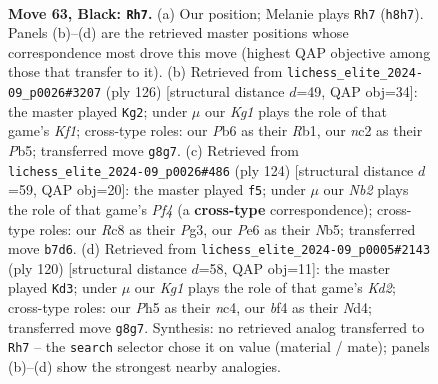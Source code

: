 \documentclass[11pt]{article}
\begin{document}
\clearpage

\begin{figure}[p]\centering
\begin{subfigure}{0.46\textwidth}\centering
\resizebox{\linewidth}{!}{%
\newchessgame
\chessboard[
  setfen={2r3kr/pn6/1p2p3/7p/2P1PB2/3K2PR/P1N2R2/8 b - - 9 63},
  showmover=false,
  pgfstyle=straightmove, color=movearrow, markmove={h8-h7}
]}
\caption{}
\end{subfigure}\hfill
\begin{subfigure}{0.46\textwidth}\centering
\resizebox{\linewidth}{!}{%
\newchessgame
\chessboard[
  setfen={5r2/6pk/6p1/1P1nr3/4p1B1/4P3/5P1P/1RR2K2 w - - 25 64},
  showmover=false,
  pgfstyle=straightmove, color=movearrow, markmove={f1-g2}
]}
\caption{}
\end{subfigure}
\\[4pt]
\begin{subfigure}{0.46\textwidth}\centering
\resizebox{\linewidth}{!}{%
\newchessgame
\chessboard[
  setfen={5bk1/1p4p1/1p2r1Pp/1N6/P4P2/6P1/3R2K1/8 w - - 5 63},
  showmover=false,
  pgfstyle=straightmove, color=movearrow, markmove={f4-f5}
]}
\caption{}
\end{subfigure}\hfill
\begin{subfigure}{0.46\textwidth}\centering
\resizebox{\linewidth}{!}{%
\newchessgame
\chessboard[
  setfen={2r1r1k1/6p1/R2p1p1p/8/P1nNP2P/6P1/2RK4/8 w - - 4 61},
  showmover=false,
  pgfstyle=straightmove, color=movearrow, markmove={d2-d3}
]}
\caption{}
\end{subfigure}
\caption{\textbf{Move 63, Black: \texttt{Rh7}.} (a) Our position; Melanie plays \texttt{Rh7} (\texttt{h8h7}). Panels (b)--(d) are the retrieved master positions whose correspondence most drove this move (highest QAP objective among those that transfer to it). (b) Retrieved from \texttt{lichess\_elite\_2024-09\_p0026\#3207} (ply 126) [structural distance $d$=49, QAP obj=34]: the master played \texttt{Kg2}; under $\mu$ our \emph{Kg1} plays the role of that game's \emph{Kf1}; cross-type roles: our \emph{P}b6 as their \emph{R}b1, our \emph{n}c2 as their \emph{P}b5; transferred move \texttt{g8g7}. (c) Retrieved from \texttt{lichess\_elite\_2024-09\_p0026\#486} (ply 124) [structural distance $d$=59, QAP obj=20]: the master played \texttt{f5}; under $\mu$ our \emph{Nb2} plays the role of that game's \emph{Pf4} (a \textbf{cross-type} correspondence); cross-type roles: our \emph{R}c8 as their \emph{P}g3, our \emph{P}e6 as their \emph{N}b5; transferred move \texttt{b7d6}. (d) Retrieved from \texttt{lichess\_elite\_2024-09\_p0005\#2143} (ply 120) [structural distance $d$=58, QAP obj=11]: the master played \texttt{Kd3}; under $\mu$ our \emph{Kg1} plays the role of that game's \emph{Kd2}; cross-type roles: our \emph{P}h5 as their \emph{n}c4, our \emph{b}f4 as their \emph{N}d4; transferred move \texttt{g8g7}. Synthesis: no retrieved analog transferred to \texttt{Rh7} -- the \texttt{search} selector chose it on value (material / mate); panels (b)--(d) show the strongest nearby analogies.}
\label{fig:thought-m125}
\end{figure}
\end{document}
